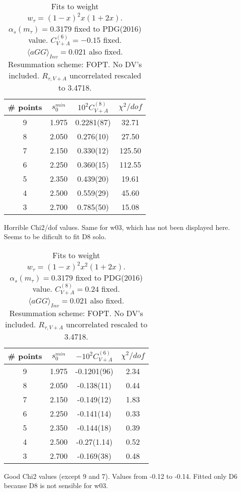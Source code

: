 \documentclass[12pt]{article}
\begin{document}
\begin{table}
  \centering
  \begin{tabular}{ | c c c c | }
    \hline
    \# points & $s_0^{min}$ & $10^2 C_{V+A}^{(8)}$ & $\chi^2/dof$ \\ 
    \hline
    9 & 1.975 & 0.2281(87) & 32.71 \\ 
    8 & 2.050 & 0.276(10) & 27.50 \\
    7 & 2.150 & 0.330(12) & 125.50 \\
    6 & 2.250 & 0.360(15) & 112.55 \\
    5 & 2.350 & 0.439(20) & 19.61 \\
    4 & 2.500 & 0.559(29) & 45.60 \\
    3 & 2.700 & 0.785(50)  & 15.08 \\
    \hline
  \end{tabular}
  \caption{Fits to weight $w_{\tau} = (1 - x)^2 x (1 + 2x)$.
    $\alpha_s(m_{\tau}) = 0.3179$ fixed to PDG(2016) value. $C_{V+A}^{(6)} = -0.15$ fixed. $\langle aGG
    \rangle_{Inv} = 0.021$ also fixed. Resummation scheme: FOPT. No DV's included.
    $R_{\tau, V+A}$ uncorrelated rescaled to 3.4718.}
\end{table}
Horrible Chi2/dof values. Same for w03, which has not been displayed here. Seems
to be dificult to fit D8 solo.


\begin{table}
  \centering
  \begin{tabular}{ | c c c c | }
    \hline
    \# points & $s_0^{min}$ & $-10^2 C_{V+A}^{(6)}$ & $\chi^2/dof$ \\ 
    \hline
    9 & 1.975 & -0.1201(96) & 2.34 \\ 
    8 & 2.050 & -0.138(11) & 0.44 \\
    7 & 2.150 & -0.149(12) & 1.83 \\
    6 & 2.250 & -0.141(14) & 0.33 \\
    5 & 2.350 & -0.144(18) & 0.39 \\
    4 & 2.500 & -0.27(1.14) & 0.52 \\
    3 & 2.700 & -0.169(38)  & 0.48 \\
    \hline
  \end{tabular}
  \caption{Fits to weight $w_{\tau} = (1 - x)^2 x^2 (1 + 2x)$.
    $\alpha_s(m_{\tau}) = 0.3179$ fixed to PDG(2016) value. $C_{V+A}^{(8)} = 0.24$ fixed. $\langle aGG
    \rangle_{Inv} = 0.021$ also fixed. Resummation scheme: FOPT. No DV's included.
    $R_{\tau, V+A}$ uncorrelated rescaled to 3.4718.}
\end{table}
Good Chi2 values (except 9 and 7). Values from -0.12 to -0.14. Fitted only D6
because D8 is not sensible for w03.
\end{document}
